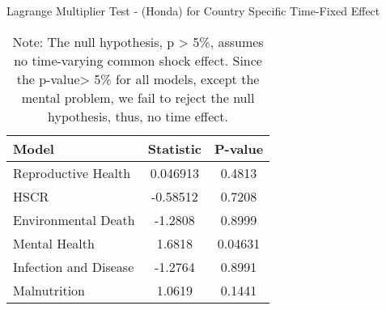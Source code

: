 \begin{table}[H]
    \centering
    \caption{Lagrange Multiplier Test - (Honda) for Country Specific Time-Fixed Effect}
    \begin{tabular}{lcc}
        \toprule
        \textbf{Model} & \textbf{Statistic} & \textbf{P-value} \\
        \midrule
        Reproductive Health & 0.046913 & 0.4813 \\
        HSCR  & -0.58512 & 0.7208 \\
        Environmental Death & -1.2808 & 0.8999 \\
        Mental Health & 1.6818 & 0.04631 \\
        Infection and Disease & -1.2764 & 0.8991 \\
        Malnutrition & 1.0619 & 0.1441 \\
        \bottomrule
    \end{tabular}
    \vspace{0.5em} %
    \caption*{Note: The null hypothesis, p > 5\%, assumes no time-varying common shock effect. Since the p-value> 5\% for all models, except the mental problem, we fail to reject the null hypothesis, thus, no time effect.}
    \label{Tab::TimeFE_test}
\end{table}

